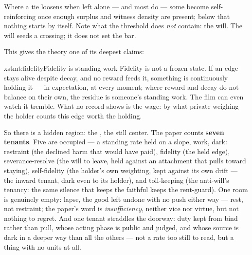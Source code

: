 \documentclass[../main_explainer]{subfiles}
\begin{document}
Where a tie loosens when left alone --- and most do --- some become self-reinforcing
once enough surplus and witness density are present; below that
 nothing starts by itself. Note what the threshold does \emph{not} contain: the
will. The will seeds a crossing; it does not set the bar.

This gives the theory one of its deepest claims:

\begin{statement}{xstmt:fidelity}{Fidelity is standing work}
  Fidelity is not a frozen state. If an edge stays alive despite decay, and no reward
  feeds it, something is
  continuously holding it --- in expectation, at every moment; where reward and decay do
  not balance on their own, the residue is someone's standing work. The film can even
  watch
  it tremble. What no record shows is the wage: by what private weighing the holder
  counts this edge worth the holding.
\end{statement}

So there is a hidden region: the , the still center. The paper counts \textbf{seven
tenants}. Five are occupied --- a standing rate held on a slope, work, dark: restraint
(the declined harm that would have paid), fidelity (the held edge), severance-resolve
(the will to leave, held against an attachment that pulls toward staying), self-fidelity
(the holder's own weighting, kept against its own drift --- the inward tenant, dark even
to its holder), and toll-keeping (the anti-will's tenancy: the same silence that keeps
the faithful keeps the rent-guard). One room is genuinely empty: lapse, the good left
undone with no push either way --- rest, not restraint; the paper's word is
\emph{insufficiency}, neither vice nor virtue, but not nothing to regret. And one tenant
straddles the doorway: duty kept from bind rather than pull, whose acting phase is
public and judged, and whose source is dark in a deeper way than all the others --- not
a rate too still to read, but a thing with no units at all.


\end{document}
